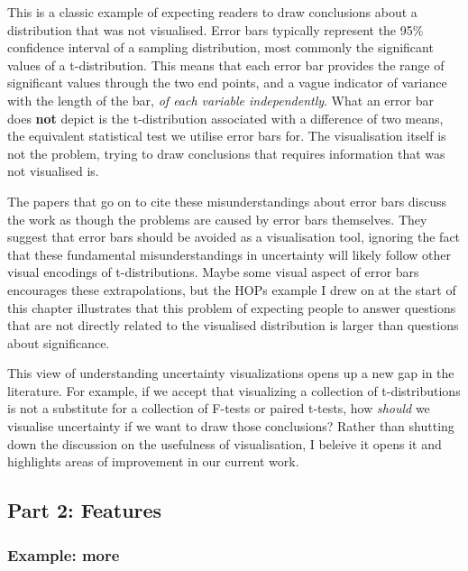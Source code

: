 \documentclass[
  letterpaper,
  DIV=11,
  numbers=noendperiod]{scrartcl}
\begin{document}
This is a classic example of expecting readers to draw conclusions about
a distribution that was not visualised. Error bars typically represent
the 95\% confidence interval of a sampling distribution, most commonly
the significant values of a t-distribution. This means that each error
bar provides the range of significant values through the two end points,
and a vague indicator of variance with the length of the bar, \emph{of
each variable independently}. What an error bar does \textbf{not} depict
is the t-distribution associated with a difference of two means, the
equivalent statistical test we utilise error bars for. The visualisation
itself is not the problem, trying to draw conclusions that requires
information that was not visualised is.

The papers that go on to cite these misunderstandings about error bars
discuss the work as though the problems are caused by error bars
themselves. They suggest that error bars should be avoided as a
visualisation tool, ignoring the fact that these fundamental
misunderstandings in uncertainty will likely follow other visual
encodings of t-distributions. Maybe some visual aspect of error bars
encourages these extrapolations, but the HOPs example I drew on at the
start of this chapter illustrates that this problem of expecting people
to answer questions that are not directly related to the visualised
distribution is larger than questions about significance.

This view of understanding uncertainty visualizations opens up a new gap
in the literature. For example, if we accept that visualizing a
collection of t-distributions is not a substitute for a collection of
F-tests or paired t-tests, how \emph{should} we visualise uncertainty if
we want to draw those conclusions? Rather than shutting down the
discussion on the usefulness of visualisation, I beleive it opens it and
highlights areas of improvement in our current work.

\hypertarget{part-2-features}{%
\subsection{Part 2: Features}\label{part-2-features}}

\hypertarget{example-more}{%
\subsubsection{Example: more}\label{example-more}}
\end{document}
